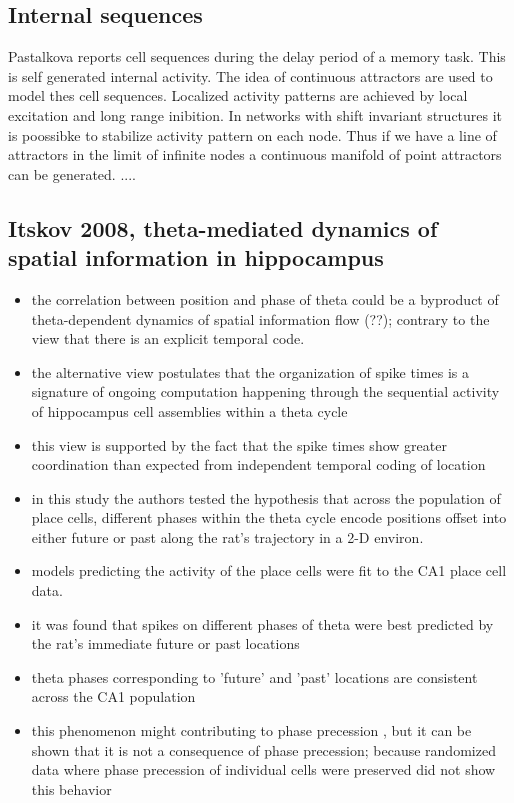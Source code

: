 \subsection{Internal sequences}
Pastalkova reports cell sequences during the delay period of a memory task. This is self generated internal activity. The idea of continuous attractors are used to model thes cell sequences. Localized activity patterns are achieved by local excitation and long range inibition. In networks  with shift invariant structures it is poossibke to stabilize activity pattern on each node. Thus if we have a line of attractors in the limit of infinite nodes a continuous manifold of point attractors can be generated.  ....


\subsection{Itskov 2008, theta-mediated dynamics of spatial information in hippocampus}
\begin{itemize}
\item the correlation between position and phase of theta could be a byproduct of theta-dependent dynamics of spatial information flow (??); contrary to the view that there is an explicit temporal code.
\item the alternative view postulates that the organization of spike times is a signature of ongoing computation happening through the sequential activity of hippocampus cell assemblies within a theta cycle
\item this view is supported by the fact that the spike times show greater coordination than expected from independent temporal coding of location
\item in this study the authors tested the hypothesis that across the population of place cells, different phases within the theta cycle encode positions offset into either future or past along the rat's trajectory in a 2-D environ.
\item models predicting the activity of the place cells were fit to the CA1 place cell data. 
\item it was found that spikes on different phases of theta were best predicted by the rat's immediate future or past locations
\item theta phases corresponding to 'future' and 'past' locations are consistent across the CA1 population
\item this phenomenon might contributing to phase precession , but it can be shown that it is not a consequence of phase precession; because randomized data where phase precession of individual cells were preserved did not show this behavior

\end{itemize}
